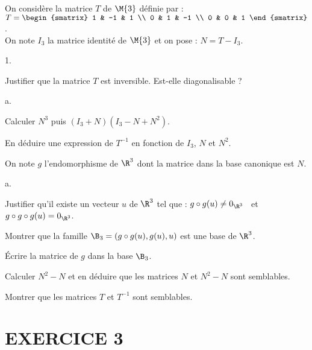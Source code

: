 \documentclass[11pt]{article}%
\begin{document}
\noindent 
On considère la matrice $T$ de $\M{3}$ définie par : $T =
\begin{smatrix}
  1 & -1 & 1 \\
  0 & 1 & -1 \\
  0 & 0 & 1
\end{smatrix}
$.\\
On note $I_3$ la matrice identité de $\M{3}$ et on pose : $N = T -
I_3$.

\begin{noliste}{1.}
  \setlength{\itemsep}{4mm} %
  \setcounter{enumi}{8}
\item Justifier que la matrice $T$ est inversible. Est-elle
  diagonalisable ?

\item 
  \begin{noliste}{a.}
    \setlength{\itemsep}{2mm} %
  \item Calculer $N^3$ puis $(I_3 + N)(I_3 - N + N^2)$.

  \item En déduire une expression de $T^{-1}$ en fonction de $I_3$,
    $N$ et $N^2$.

  \end{noliste}

\item On note $g$ l'endomorphisme de $\R^3$ dont la matrice dans la
  base canonique est $N$.
  \begin{noliste}{a.}
    \setlength{\itemsep}{2mm} %
  \item Justifier qu'il existe un vecteur $u$ de $\R^3$ tel que : $g
    \circ g (u) \neq 0_{\R^3}$ \ et \ $g \circ g \circ g (u) =
    0_{\R^3}$.

  \item Montrer que la famille $\B_3 = (g \circ g(u), g(u), u)$ est
    une base de $\R^3$.

  \item Écrire la matrice de $g$ dans la base $\B_3$.

  \item Calculer $N^2 - N$ et en déduire que les matrices $N$ et $N^2
    - N$ sont semblables.
  \end{noliste}

\item Montrer que les matrices $T$ et $T^{-1}$ sont semblables.

\end{noliste}




\section*{EXERCICE 3} %
\end{document}
